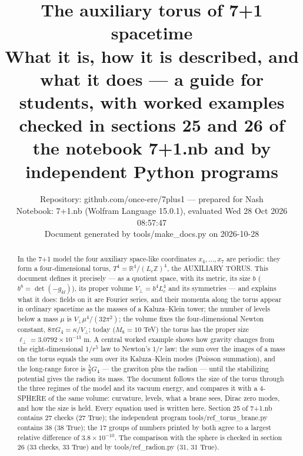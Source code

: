 \documentclass[10pt,a4paper]{article}
\begin{document}
\title{The auxiliary torus of 7+1 spacetime\\[0.4em]\large What it is, how it is described, and what it does — a guide for students, with worked examples checked in sections 25 and 26 of the notebook 7+1.nb and by independent Python programs}
\author{Repository: github.com/once-ere/7plus1 — prepared for Nash\\ Notebook: 7+1.nb (Wolfram Language 15.0.1), evaluated Wed 28 Oct 2026 08:57:47\\ Document generated by tools/make\_docs.py on 2026-10-28}
\date{}
\maketitle
\begin{abstract}
In the 7+1 model the four auxiliary space-like coordinates $x_4,\dots,x_7$ are periodic: they form a four-dimensional torus, $T^4=\mathbb R^4/(L_c\mathbb Z)^4$, the AUXILIARY TORUS. This document defines it precisely — as a quotient space, with its metric, its size $b$ ($b^8=\det(-g_{kl})$), its proper volume $V_\perp=b^4L_c^4$ and its symmetries — and explains what it does: fields on it are Fourier series, and their momenta along the torus appear in ordinary spacetime as the masses of a Kaluza–Klein tower; the number of levels below a mass $\mu$ is $V_\perp\mu^4/(32\pi^2)$; the volume fixes the four-dimensional Newton constant, $8\pi G_4=\kappa/V_\perp$; today ($M_8=10$ TeV) the torus has the proper size $\ell_\perp=3.0792\times10^{-13}$ m. A central worked example shows how gravity changes from the eight-dimensional $1/r^5$ law to Newton’s $1/r$ law: the sum over the images of a mass on the torus equals the sum over its Kaluza–Klein modes (Poisson summation), and the long-range force is $\frac53G_4$ — the graviton plus the radion — until the stabilizing potential gives the radion its mass. The document follows the size of the torus through the three regimes of the model and its vacuum energy, and compares it with a 4-SPHERE of the same volume: curvature, levels, what a brane sees, Dirac zero modes, and how the size is held. Every equation used is written here. Section 25 of 7+1.nb contains 27 checks (27 True); the independent program tools/ref\_torus\_brane.py contains 38 (38 True); the 17 groups of numbers printed by both agree to a largest relative difference of $3.8\times10^{-10}$. The comparison with the sphere is checked in section 26 (33 checks, 33 True) and by tools/ref\_radion.py (31, 31 True).
\end{abstract}
\tableofcontents
\end{document}
